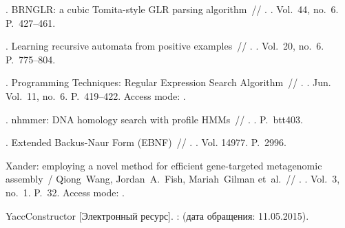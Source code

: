 \begin{thebibliography}{10}
	. {BRNGLR}: a
	cubic Tomita-style {GLR} parsing algorithm~// .
	\BibDash
	. \BibDash
	\newblock Vol.~44, no.~6. \BibDash
	\newblock P.~427--461.
	
	. Learning recursive automata from positive
	examples~// . \BibDash
	. \BibDash
	\newblock Vol.~20, no.~6. \BibDash
	\newblock P.~775--804.
	
	. Programming Techniques: Regular Expression Search
	Algorithm~// \href{http://dx.doi.org/10.1145/363347.363387}{}. \BibDash
	. \BibDash Jun. \BibDash
	\newblock Vol.~11, no.~6. \BibDash
	\newblock P.~419--422. \BibDash
	\newblock Access mode: .
	
	. nhmmer: DNA homology search with
	profile HMMs~// . \BibDash
	. \BibDash
	\newblock P.~btt403.
	
	. Extended Backus-Naur Form ({EBNF})~//
	. \BibDash
	. \BibDash
	\newblock Vol. 14977. \BibDash
	\newblock P.~2996.
	
	Xander: employing a novel method for efficient gene-targeted metagenomic
	assembly~/ Qiong~Wang, Jordan~A.~Fish, Mariah~Gilman et~al.~//
	\href{http://dx.doi.org/10.1186/s40168-015-0093-6}{}.
	\BibDash
	. \BibDash
	\newblock Vol.~3, no.~1. \BibDash
	\newblock P.~32. \BibDash
	\newblock Access mode: .
	
	YaccConstructor [Электронный ресурс]. \BibDash
	:
	 ({дата обращения}:
	11.05.2015).
	
\end{thebibliography}
